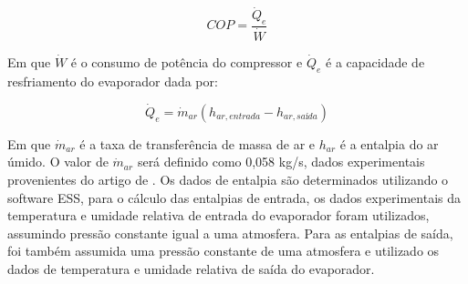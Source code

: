 \begin{equation}
    COP = \frac{\dot Q_e}{\dot W}
    \label{eq:COP}
\end{equation}

Em que $\dot W$ é o consumo de potência do compressor e $ \dot Q_e$ é a capacidade de resfriamento do evaporador dada por:

\begin{equation}
    \dot Q_e = \dot m_{ar}(h_{ar,entrada} - h_{ar,saída})
\end{equation}

Em que $\dot m_{ar}$ é a taxa de transferência de massa de ar e $h_{ar}$ é a entalpia do ar úmido. O valor de $\dot m_{ar}$ será definido como 0,058 kg/s, dados experimentais provenientes do artigo de \textcite{ExperimentalThermalPerformance}. Os dados de entalpia são determinados utilizando o software ESS, para o cálculo das entalpias de entrada, os dados experimentais da temperatura e umidade relativa de entrada do evaporador foram utilizados, assumindo pressão constante igual a uma atmosfera. Para as entalpias de saída, foi também assumida uma pressão constante de uma atmosfera e utilizado os dados de temperatura e umidade relativa de saída do evaporador. 